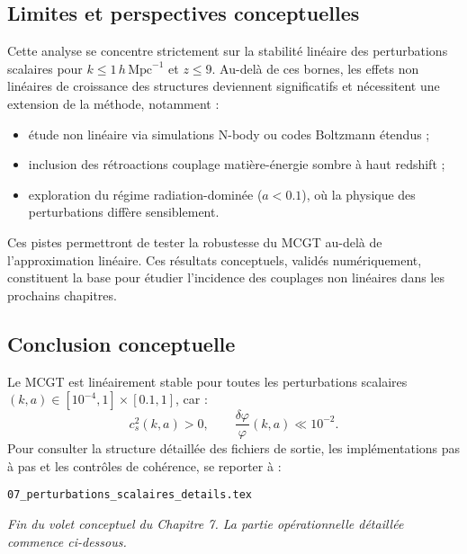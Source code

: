 \subsection*{Limites et perspectives conceptuelles}
Cette analyse se concentre strictement sur la stabilité linéaire des perturbations scalaires pour \(k\le1\,h\,\mathrm{Mpc}^{-1}\) et \(z\le9\).
Au-delà de ces bornes, les effets non linéaires de croissance des structures deviennent significatifs et nécessitent une extension de la méthode, notamment :
\begin{itemize}
  \item étude non linéaire via simulations N-body ou codes Boltzmann étendus ;
  \item inclusion des rétroactions couplage matière-énergie sombre à haut redshift ;
  \item exploration du régime radiation-dominée (\(a<0.1\)), où la physique des perturbations diffère sensiblement.
\end{itemize}
Ces pistes permettront de tester la robustesse du MCGT au-delà de l’approximation linéaire.
Ces résultats conceptuels, validés numériquement, constituent la base pour étudier l’incidence des couplages non linéaires dans les prochains chapitres.

\subsection{Conclusion conceptuelle}
Le MCGT est linéairement stable pour toutes les perturbations scalaires \((k,a)\in[10^{-4},1]\times[0.1,1]\), car :
\[
  c_{s}^{2}(k,a) > 0,
  \qquad
  \frac{\delta\varphi}{\varphi}(k,a) \ll 10^{-2}.
\]
Pour consulter la structure détaillée des fichiers de sortie, les implémentations pas à pas et les contrôles de cohérence, se reporter à :
\begin{center}
  \texttt{07\_perturbations\_scalaires\_details.tex}
\end{center}

\noindent\emph{Fin du volet conceptuel du Chapitre 7. La partie opérationnelle détaillée commence ci-dessous.}
